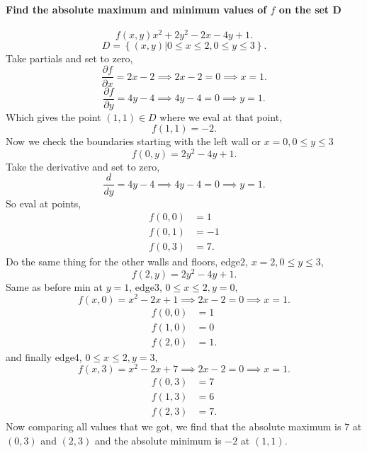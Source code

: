 \paragraph{Find the absolute maximum and minimum values of $ f $ on the set D}
\[
f\left( x,y \right) x^2+2y^2-2x-4y+1
.\] 
\[
D=\left\{ \left( x,y \right) \big| 0 \le x \le 2, 0 \le y \le 3 \right\} 
.\] 
Take partials and set to zero,
\[
\frac{ \partial f}{\partial x} =2x-2 \implies 2x-2 = 0 \implies x=1
.\] 
\[
\frac{ \partial f}{\partial y} =4y-4 \implies 4y-4 = 0 \implies y=1
.\] 
Which gives the point $ \left( 1,1 \right) \in D $ where we eval at that point,
\[
f\left( 1,1 \right) = -2
.\] 
Now we check the boundaries starting with the left wall or $ x=0,0\le y \le 3 $
\[
f\left( 0,y \right) = 2y^2-4y+1 
.\] 
Take the derivative and set to zero,
\[
\frac{ d }{ dy } = 4y-4 \implies 4y-4 = 0 \implies y=1
.\] 
So eval at points,
\begin{align}
	f\left( 0,0 \right) &= 1 \\
	f\left( 0,1 \right) &= -1 \\
	f\left( 0,3 \right) &= 7
.\end{align}
Do the same thing for the other walls and floors, edge2, $ x=2,0\le y \le 3 $,
\[
f\left( 2,y \right) = 2y^2-4y+1
.\] 
Same as before min at $ y=1 $, edge3, $ 0\le x \le 2,y=0 $,
\[
f\left( x,0 \right) = x^2-2x+1 \implies 2x-2 = 0 \implies x=1
.\] 
\begin{align}
	f\left( 0,0 \right) &= 1 \\
	f\left( 1,0 \right) &= 0 \\
	f\left( 2,0 \right) &= 1
.\end{align}
and finally edge4, $ 0\le x \le 2,y=3 $,
\[
f\left( x,3 \right) = x^2-2x+7 \implies 2x-2 = 0 \implies x=1
.\] 
\begin{align}
	f\left( 0,3 \right) &= 7 \\
	f\left( 1,3 \right) &= 6 \\
	f\left( 2,3 \right) &= 7
.\end{align}
Now comparing all values that we got, we find that the absolute maximum is $ 7 $ at $ \left( 0,3 \right) $ and $ \left( 2,3 \right) $ and the absolute minimum is $ -2 $ at $ \left( 1,1 \right) $.
